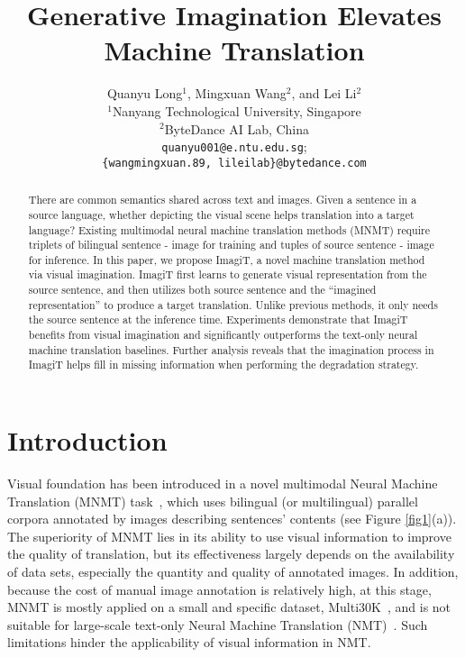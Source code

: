 \documentclass[11pt]{article}
\title{Generative Imagination Elevates Machine Translation}
\author{Quanyu Long$^1$, Mingxuan Wang$^2$, and Lei Li$^2$ \\
  $^1$Nanyang Technological University, Singapore \\
  $^2$ByteDance AI Lab, China\\
  \texttt{quanyu001@e.ntu.edu.sg}; \\
  \texttt{\{wangmingxuan.89, lileilab\}@bytedance.com}
  }
\newcommand{\method}{ImagiT\xspace}
\begin{document}
\maketitle

\begin{abstract}
There are common semantics shared across text and images. 
Given a sentence in a source language, whether depicting the visual scene helps translation into a target language?
Existing multimodal neural machine translation methods (MNMT) require triplets of bilingual sentence - image for training and tuples of source sentence - image for inference.
In this paper, we propose \method, a novel machine translation method via visual imagination. 
\method first learns to generate visual representation from the source sentence, and then utilizes both source sentence and the ``imagined representation'' to produce a target translation.
Unlike previous methods, it only needs the source sentence at the inference time. 
Experiments demonstrate that \method benefits from visual imagination and significantly outperforms the text-only neural machine translation baselines. 
Further analysis reveals that the imagination process in \method  helps fill in missing information when performing the degradation strategy. 



%
 \end{abstract}

\section{Introduction}
\label{sec:intro}
Visual foundation has been introduced in a novel multimodal Neural Machine Translation (MNMT) task~\citep{specia2016shared,elliott2017findings,barrault2018findings}, which uses bilingual (or multilingual) parallel corpora annotated by images describing sentences' contents (see Figure \ref{fig1}(a)). The superiority of MNMT lies in its ability to use visual information to improve the quality of translation, but its effectiveness largely depends on the availability of data sets, especially the quantity and quality of annotated images. In addition, because the cost of manual image annotation is relatively high, at this stage, MNMT is mostly applied on a small and specific dataset, Multi30K~\cite{elliott2016multi30k}, and is not suitable for large-scale text-only Neural Machine Translation (NMT)~\cite{bahdanau2014neural,vaswani2017attention}. Such limitations hinder the applicability of visual information in NMT.
\end{document}

